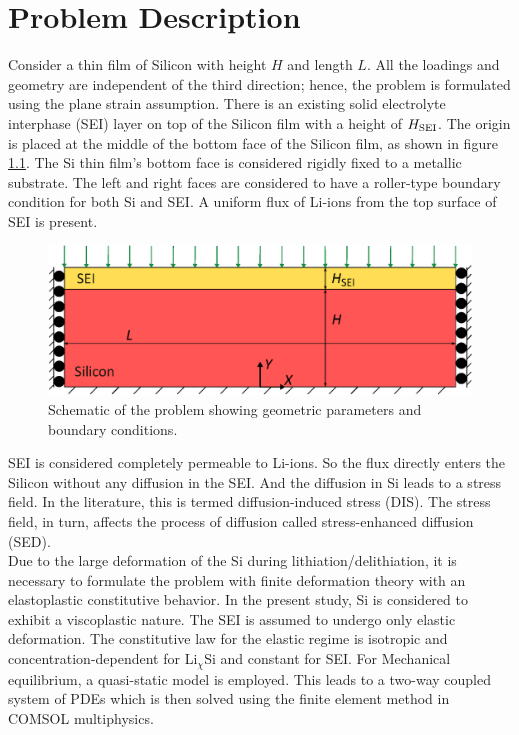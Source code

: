 \chapter{Problem Description}
Consider a thin film of Silicon with height $H$ and length $L$. All the loadings and geometry are independent of the third direction; hence, the problem is formulated using the plane strain assumption. There is an existing solid electrolyte interphase (SEI) layer on top of the Silicon film with a height of $H_{\rm{SEI}}$. The origin is placed at the middle of the bottom face of the Silicon film, as shown in figure \ref{fig:probDesc}. The Si thin film's bottom face is considered rigidly fixed to a metallic substrate. The left and right faces are considered to have a roller-type boundary condition for both Si and SEI. A uniform flux of Li-ions from the top surface of SEI is present. 
\begin{figure}[H]
    \centering
    \includegraphics[width=\textwidth]{figures/probDescFigs/drawing.eps}
    \caption{Schematic of the problem showing geometric parameters and boundary conditions.}
    \label{fig:probDesc}
\end{figure}
SEI is considered completely permeable to Li-ions. So the flux directly enters the Silicon without any diffusion in the SEI. And the diffusion in Si leads to a stress field. In the literature, this is termed diffusion-induced stress (DIS). The stress field, in turn, affects the process of diffusion called stress-enhanced diffusion (SED). \\
Due to the large deformation of the Si during lithiation/delithiation, it is necessary to formulate the problem with finite deformation theory with an elastoplastic constitutive behavior. In the present study, Si is considered to exhibit a viscoplastic nature. The SEI is assumed to undergo only elastic deformation. The constitutive law for the elastic regime is isotropic and concentration-dependent for Li$_\chi$Si and constant for SEI. 
For Mechanical equilibrium, a quasi-static model is employed. This leads to a two-way coupled system of PDEs which is then solved using the finite element method in COMSOL multiphysics.